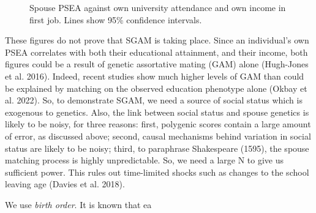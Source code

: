 \documentclass[
]{article}
\theoremstyle{definition}
\theoremstyle{definition}
\theoremstyle{definition}
\theoremstyle{definition}
\theoremstyle{remark}
\begin{document}
\begin{figure}

{\centering {}\newline{}

}

\caption{Spouse PSEA against own university attendance and own income in first job. Lines show 95\% confidence intervals.}\label{fig:pic-basic-corr}
\end{figure}

These figures do not prove that SGAM is taking place. Since an
individual's own PSEA correlates with both their educational attainment,
and their income, both figures could be a result of genetic assortative
mating (GAM) alone (Hugh-Jones et al. 2016). Indeed, recent studies show much
higher levels of GAM than could be explained by matching on the observed
education phenotype alone (Okbay et al. 2022). So, to demonstrate SGAM, we need
a source of social status which is exogenous to genetics. Also, the link
between social status and spouse genetics is likely to be noisy, for
three reasons: first, polygenic scores contain a large amount of error, as
discussed above; second, causal mechanisms behind variation in social status
are likely to be noisy; third, to paraphrase Shakespeare (1595), the
spouse matching process is highly unpredictable. So, we need a large N to
give us sufficient power. This rules out time-limited shocks such as
changes to the school leaving age (Davies et al. 2018).

We use \emph{birth order}. It is known that ea
\end{document}
